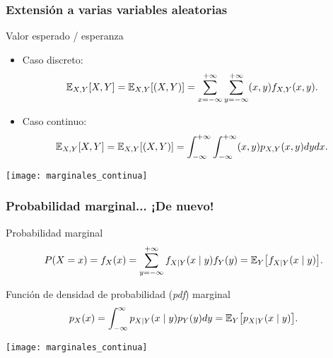 \documentclass[table]{beamer}
\begin{document}
\begin{frame}
    \frametitle{Extensión a varias variables aleatorias}
    \begin{block}{Valor esperado / esperanza}
        \begin{itemize}
            \item Caso discreto:
                \begin{equation*}
                    \expecteddist{X, Y}{X, Y} = \expecteddist{X, Y}{\parens{X, Y}} = \sum_{x = - \infty}^{+ \infty} \sum_{y = - \infty}^{+ \infty} \parens{x , y} \pff{X, Y}{x , y} .
                \end{equation*}
            \item Caso continuo:
                \begin{equation*}
                    \expecteddist{X, Y}{X, Y} = \expecteddist{X, Y}{\parens{X, Y}} = \int_{- \infty}^{+ \infty} \int_{- \infty}^{+ \infty} \parens{x , y} \ppdf{X, Y}{x , y} d y d x .
                \end{equation*}
        \end{itemize}
    \end{block}
    \begin{center}
        \texttt{[image: marginales\_continua]}
    \end{center}
\end{frame}

\begin{frame}
    \frametitle{Probabilidad marginal... ¡De nuevo!}
    \begin{block}{Probabilidad marginal}
        \begin{equation*}
            \prob{X = x} = \pff{X}{x}
            = \sum_{y = - \infty}^{+ \infty} \pff{X \mid Y}{x \mid y} \pff{Y}{y}
            = \expecteddist{Y}{\pff{X \mid Y}{x \mid y}} .
        \end{equation*}
    \end{block}
    \begin{block}{Función de densidad de probabilidad (\emph{pdf}) marginal}
        \begin{equation*}
            \ppdf{X}{x}
            = \int_{- \infty}^{\infty} \ppdf{X \mid Y}{x \mid y} \ppdf{Y}{y} d y
            = \expecteddist{Y}{\ppdf{X \mid Y}{x \mid y}} .
        \end{equation*}
    \end{block}
    \begin{center}
        \texttt{[image: marginales\_continua]}
    \end{center}
\end{frame}
\end{document}
